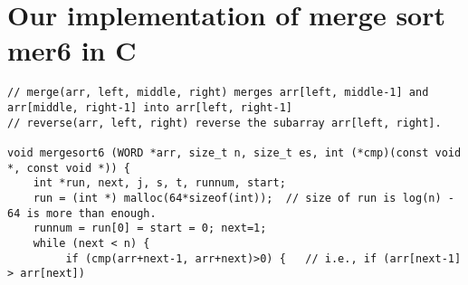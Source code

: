 \documentclass[AMA,STIX1COL]{WileyNJD-v2}
\begin{document}
\section{Our implementation of merge sort mer6 in C}
\label{ccode}
\begin{lstlisting}[style=CStyle]
// merge(arr, left, middle, right) merges arr[left, middle-1] and arr[middle, right-1] into arr[left, right-1]
// reverse(arr, left, right) reverse the subarray arr[left, right].

void mergesort6 (WORD *arr, size_t n, size_t es, int (*cmp)(const void *, const void *)) {                                                                                       
    int *run, next, j, s, t, runnum, start;                                                                                                                                             
    run = (int *) malloc(64*sizeof(int));  // size of run is log(n) - 64 is more than enough.
    runnum = run[0] = start = 0; next=1;                                                                                                                                                                        
    while (next < n) {                                                                                                                                                             
         if (cmp(arr+next-1, arr+next)>0) {   // i.e., if (arr[next-1] > arr[next])     
                                                                                                                                      

\end{lstlisting}
\end{document}
